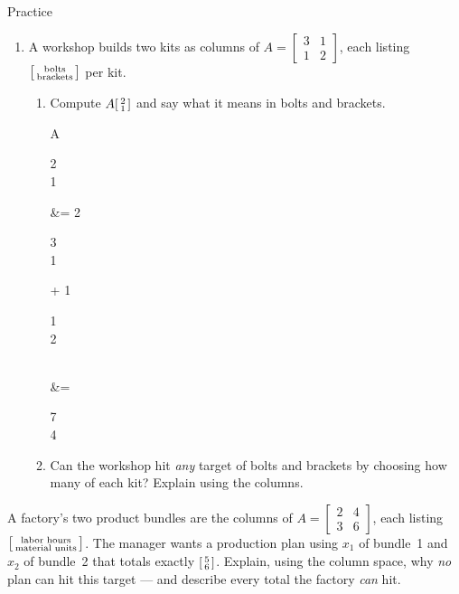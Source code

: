 \documentclass[10pt]{article}
\begin{document}
\begin{notesbox}{Practice}
\begin{enumerate}[leftmargin=1.9em, itemsep=10pt]
\begin{enumerate}[label=(\alph*), leftmargin=1.8em, itemsep=4pt]
    \end{enumerate}
  \tcbbreak
  \item A workshop builds two kits as columns of $A=\begin{bmatrix} 3 & 1 \\ 1 & 2 \end{bmatrix}$,
        each listing $\begin{bsmallmatrix} \text{bolts} \\ \text{brackets} \end{bsmallmatrix}$ per kit.
    \begin{enumerate}[label=(\alph*), leftmargin=1.8em, itemsep=5pt]
      \item Compute $A\begin{bsmallmatrix} 2 \\ 1 \end{bsmallmatrix}$ and say what it means in
            bolts and brackets.
\begin{work}
  A\begin{bsmallmatrix} 2\\1 \end{bsmallmatrix}
      &= 2\begin{bsmallmatrix} 3\\1 \end{bsmallmatrix} + 1\begin{bsmallmatrix} 1\\2 \end{bsmallmatrix} \\
      &= \begin{bsmallmatrix} 7\\4 \end{bsmallmatrix}
\end{work}
            \writeline
      \item Can the workshop hit \emph{any} target of bolts and brackets by choosing how many of
            each kit? Explain using the columns. \writeline
    \end{enumerate}
\end{enumerate}
\end{notesbox}

\begin{extensionbox}
A factory's two product bundles are the columns of $A=\begin{bmatrix} 2 & 4 \\ 3 & 6 \end{bmatrix}$,
each listing $\begin{bsmallmatrix} \text{labor hours} \\ \text{material units} \end{bsmallmatrix}$.
The manager wants a production plan using $x_1$ of bundle~1 and $x_2$ of bundle~2 that totals
exactly $\begin{bsmallmatrix} 5 \\ 6 \end{bsmallmatrix}$. Explain, using the column space, why
\emph{no} plan can hit this target --- and describe every total the factory \emph{can} hit. 
\end{extensionbox}
\end{document}

